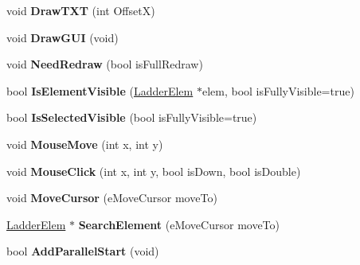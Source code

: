 \begin{DoxyCompactItemize}
\item 
\hypertarget{class_ladder_diagram_ae085b4dad746914f503109edd48e835e}{void {\bfseries Draw\-T\-X\-T} (int Offset\-X)}\label{class_ladder_diagram_ae085b4dad746914f503109edd48e835e}

\item 
\hypertarget{class_ladder_diagram_a76e40f92784b491b2878593d11a6468c}{void {\bfseries Draw\-G\-U\-I} (void)}\label{class_ladder_diagram_a76e40f92784b491b2878593d11a6468c}

\item 
\hypertarget{class_ladder_diagram_a8dacdd5e729b31e7b84c8f309c538630}{void {\bfseries Need\-Redraw} (bool is\-Full\-Redraw)}\label{class_ladder_diagram_a8dacdd5e729b31e7b84c8f309c538630}

\item 
\hypertarget{class_ladder_diagram_a8281cf6cb963920e4f33d8ab713e816a}{bool {\bfseries Is\-Element\-Visible} (\hyperlink{class_ladder_elem}{Ladder\-Elem} $\ast$elem, bool is\-Fully\-Visible=true)}\label{class_ladder_diagram_a8281cf6cb963920e4f33d8ab713e816a}

\item 
\hypertarget{class_ladder_diagram_ad759d7de6d21facde36097367d408a4a}{bool {\bfseries Is\-Selected\-Visible} (bool is\-Fully\-Visible=true)}\label{class_ladder_diagram_ad759d7de6d21facde36097367d408a4a}

\item 
\hypertarget{class_ladder_diagram_a42ff9c87ca2aa69b4cd5979183de87c3}{void {\bfseries Mouse\-Move} (int x, int y)}\label{class_ladder_diagram_a42ff9c87ca2aa69b4cd5979183de87c3}

\item 
\hypertarget{class_ladder_diagram_a668c9201eaec8017096c563152e98f37}{void {\bfseries Mouse\-Click} (int x, int y, bool is\-Down, bool is\-Double)}\label{class_ladder_diagram_a668c9201eaec8017096c563152e98f37}

\item 
\hypertarget{class_ladder_diagram_a68890a0c7dc63663b5c8354efeb63d76}{void {\bfseries Move\-Cursor} (e\-Move\-Cursor move\-To)}\label{class_ladder_diagram_a68890a0c7dc63663b5c8354efeb63d76}

\item 
\hypertarget{class_ladder_diagram_a233b99e6a7c7c593516991764c7e3c8d}{\hyperlink{class_ladder_elem}{Ladder\-Elem} $\ast$ {\bfseries Search\-Element} (e\-Move\-Cursor move\-To)}\label{class_ladder_diagram_a233b99e6a7c7c593516991764c7e3c8d}

\item 
\hypertarget{class_ladder_diagram_a61586c47c22ac18ad532a5696de5d5e9}{bool {\bfseries Add\-Parallel\-Start} (void)}\label{class_ladder_diagram_a61586c47c22ac18ad532a5696de5d5e9}


\end{DoxyCompactItemize}

